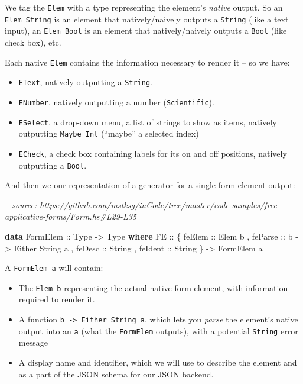 \documentclass[]{article}
\newenvironment{Shaded}{}{}
\newcommand{\CommentTok}[1]{\textcolor[rgb]{0.38,0.63,0.69}{\textit{#1}}}
\newcommand{\DataTypeTok}[1]{\textcolor[rgb]{0.56,0.13,0.00}{#1}}
\newcommand{\KeywordTok}[1]{\textcolor[rgb]{0.00,0.44,0.13}{\textbf{#1}}}
\newcommand{\NormalTok}[1]{#1}
\newcommand{\OtherTok}[1]{\textcolor[rgb]{0.00,0.44,0.13}{#1}}
\begin{document}
We tag the \texttt{Elem} with a type representing the element's \emph{native}
output. So an \texttt{Elem\ String} is an element that natively/naively outputs
a \texttt{String} (like a text input), an \texttt{Elem\ Bool} is an element that
natively/naively outputs a \texttt{Bool} (like check box), etc.

Each native \texttt{Elem} contains the information necessary to render it -- so
we have:

\begin{itemize}
\tightlist
\item
  \texttt{EText}, natively outputting a \texttt{String}.
\item
  \texttt{ENumber}, natively outputting a number (\texttt{Scientific}).
\item
  \texttt{ESelect}, a drop-down menu, a list of strings to show as items,
  natively outputting \texttt{Maybe\ Int} (``maybe'' a selected index)
\item
  \texttt{ECheck}, a check box containing labels for its on and off positions,
  natively outputting a \texttt{Bool}.
\end{itemize}

And then we our representation of a generator for a single form element output:

\begin{Shaded}
\begin{Highlighting}[]
\CommentTok{-- source: https://github.com/mstksg/inCode/tree/master/code-samples/free-applicative-forms/Form.hs#L29-L35}

\KeywordTok{data} \DataTypeTok{FormElem}\OtherTok{ ::} \DataTypeTok{Type} \OtherTok{->} \DataTypeTok{Type} \KeywordTok{where}
    \DataTypeTok{FE}\OtherTok{ ::}\NormalTok{ \{}\OtherTok{ feElem  ::} \DataTypeTok{Elem}\NormalTok{ b}
\NormalTok{          ,}\OtherTok{ feParse ::}\NormalTok{ b }\OtherTok{->} \DataTypeTok{Either} \DataTypeTok{String}\NormalTok{ a}
\NormalTok{          ,}\OtherTok{ feDesc  ::} \DataTypeTok{String}
\NormalTok{          ,}\OtherTok{ feIdent ::} \DataTypeTok{String}
\NormalTok{          \}}
        \OtherTok{->} \DataTypeTok{FormElem}\NormalTok{ a}
\end{Highlighting}
\end{Shaded}

A \texttt{FormElem\ a} will contain:

\begin{itemize}
\tightlist
\item
  The \texttt{Elem\ b} representing the actual native form element, with
  information required to render it.
\item
  A function \texttt{b\ -\textgreater{}\ Either\ String\ a}, which lets you
  \emph{parse} the element's native output into an \texttt{a} (what the
  \texttt{FormElem} outputs), with a potential \texttt{String} error message
\item
  A display name and identifier, which we will use to describe the element and
  as a part of the JSON schema for our JSON backend.
\end{itemize}
\end{document}
